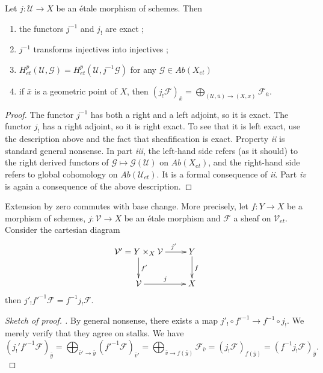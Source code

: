 \begin{proposition}
\label{proposition-describe-jshriek}
Let $j : \mathcal{U} \to X$ be an \'etale morphism of schemes. Then
\begin{enumerate}
\item the functors $j^{-1}$ and $j_!$ are exact ;
\item $j^{-1}$ transforms injectives into injectives ;
\item $H_{et}^p(\mathcal{U}, \mathcal{G})= H_{et}^p(\mathcal{U},
j^{-1}\mathcal{G})$ for any $\mathcal{G} \in \textit{Ab}(X_{et})$
\item if $\bar x$ is a geometric point of $X$, then
$\left(j_!\mathcal{F}\right)_{\bar x} =\displaystyle \bigoplus_{(\mathcal{U},
\bar u) \to (X, x)} \mathcal{F}_{\bar{u}}$.
\end{enumerate}
\end{proposition}

\begin{proof}
The functor $j^{-1}$ has both a right and a left adjoint, so it is exact. The
functor $j_!$ has a right adjoint, so it is right exact. To see that it is left
exact, use the description above and the fact that sheafification is exact.
Property {\it ii} is standard general nonsense. In part {\it iii}, the
left-hand side refers (as it should) to the right derived functors of
$\mathcal{G}\mapsto \mathcal{G}(\mathcal{U})$ on $\textit{Ab}(X_{et})$, and the
right-hand side refers to global cohomology on $\textit{Ab}(\mathcal{U}_{et})$.
It is a formal consequence of {\it ii}. Part {\it iv} is again a consequence of
the above description.
\end{proof}

\begin{lemma}
\label{lemma-shriek-base-change}
Extension by zero commutes with base change. More precisely, let $f: Y \to X$
be a morphism of schemes, $j: \mathcal{V} \to X$ be an \'etale morphism and
$\mathcal{F}$ a sheaf on $\mathcal{V}_{et}$. Consider the cartesian diagram
$$
\xymatrix{
{\mathcal{V}'=Y\times_X \mathcal{V}} \ar^{f'}[d] \ar^{\qquad j'}[r] & {Y}
\ar^{f}[d] \\
{\mathcal{V}} \ar^{j}[r] & {X}
}
$$
then $j'_! f'^{-1}\mathcal{F} = f^{-1}j_!\mathcal{F}$.
\end{lemma}

\begin{proof}[Sketch of proof. ]
By general nonsense, there exists a map $j'_! \circ f'^{-1} \to f^{-1}\circ
j_!$. We merely verify that they agree on stalks. We have
$$
\left(j_!'f'^{-1}\mathcal{F}\right)_{\bar y} =
\bigoplus_{\bar v' \to \bar y} (f'^{-1}\mathcal{F})_{\bar v'} =
\bigoplus_{\bar v \to f(\bar y)} \mathcal{F}_{\bar v} =
(j_!\mathcal{F})_{f(\bar y)} =
(f^{-1}j_!\mathcal{F})_{\bar y}.
$$
\end{proof}


